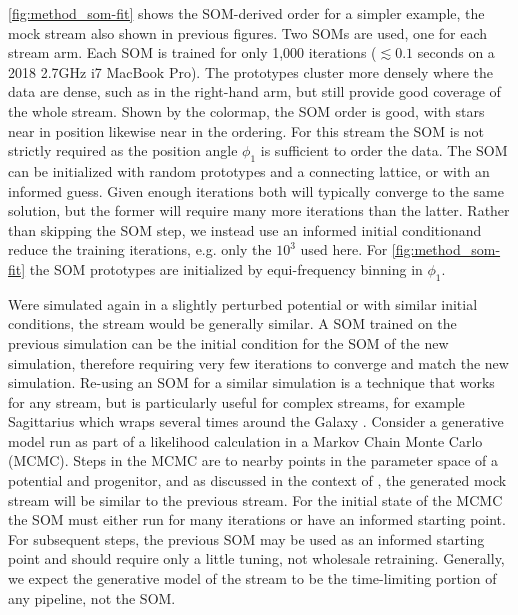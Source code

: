 \documentclass[fleqn,usenatbib]{mnras}
\begin{document}
      \autoref{fig:method_som-fit} shows the SOM-derived order for a simpler
      example, the mock  stream also shown in previous figures.
      Two SOMs are used, one for each stream arm. Each SOM is trained for only
      1,000 iterations ($\lesssim0.1$ seconds on a 2018 2.7GHz i7 MacBook Pro).
      The prototypes cluster more densely where the data are dense, such as in
      the right-hand arm, but still provide good coverage of the whole stream.
      Shown by the colormap, the SOM order is good, with stars near in position
      likewise near in the ordering. For this stream the SOM is not strictly
      required as the position angle $\phi_1$ is sufficient to order the data.
      The SOM can be initialized with random prototypes and a connecting
      lattice, or with an informed guess. Given enough iterations both will
      typically converge to the same solution, but the former will require many
      more iterations than the latter. Rather than skipping the SOM step, we
      instead use an informed initial condition\footnotemark and reduce the
      training iterations, e.g. only the $10^3$ used here. For
      \autoref{fig:method_som-fit} the SOM prototypes are initialized by
      equi-frequency binning in $\phi_1$.

    
      Were  simulated again in a slightly perturbed potential
      or with similar initial conditions, the stream would be generally similar.
      A SOM trained on the previous simulation can be the initial condition for
      the SOM of the new simulation, therefore requiring very few iterations to
      converge and match the new simulation. Re-using an SOM for a similar
      simulation is a technique that works for any stream, but is particularly
      useful for complex streams, for example Sagittarius which wraps several
      times around the Galaxy \citep{Koposov2012}. Consider a generative model
      run as part of a likelihood calculation in a Markov Chain Monte Carlo
      (MCMC). Steps in the MCMC are to nearby points in the parameter space of a
      potential and progenitor, and as discussed in the context of
      , the  generated mock stream will be similar to the
      previous stream. For the initial state of the MCMC the SOM must either run
      for many iterations or have an informed starting point. For subsequent
      steps, the previous SOM may be used as an informed starting point and
      should require only a little tuning, not wholesale retraining. Generally,
      we expect the generative model of the stream to be the time-limiting
      portion of any pipeline, not the SOM.
\end{document}
